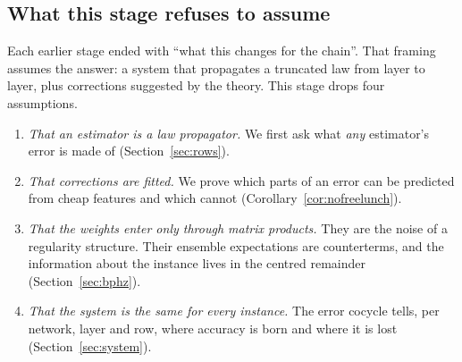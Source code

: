 \label{sec:summary}
\subsection{What this stage refuses to assume}
Each earlier stage ended with ``what this changes for the chain''. That framing assumes the answer: a system that propagates a truncated
law from layer to layer, plus corrections suggested by the theory. This stage drops four assumptions.
\begin{enumerate}[leftmargin=*]
\item \emph{That an estimator is a law propagator.} We first ask what \emph{any} estimator's error is made of (Section~\ref{sec:rows}).
\item \emph{That corrections are fitted.} We prove which parts of an error can be predicted from cheap features and which cannot
(Corollary~\ref{cor:nofreelunch}).
\item \emph{That the weights enter only through matrix products.} They are the noise of a regularity structure. Their ensemble expectations
are counterterms, and the information about the instance lives in the centred remainder (Section~\ref{sec:bphz}).
\item \emph{That the system is the same for every instance.} The error cocycle tells, per network, layer and row, where accuracy is born
and where it is lost (Section~\ref{sec:system}).
\end{enumerate}

